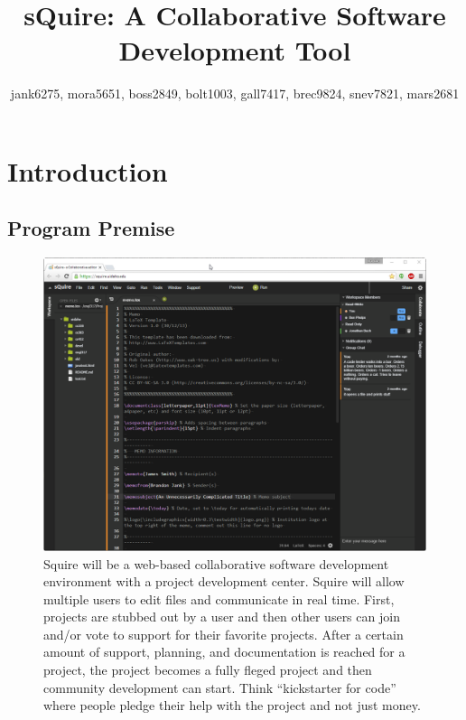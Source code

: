 \documentclass[11pt]{report}
\title{sQuire: A Collaborative Software Development Tool}
\author{jank6275, mora5651, boss2849, bolt1003, gall7417, brec9824, snev7821, mars2681}
\begin{document}
\maketitle

\tableofcontents

\chapter{Introduction}

\section{Program Premise}
    \begin{figure}[h!]
        \caption{Squire will be a web-based collaborative software development environment with a project development center. Squire will allow multiple users to edit files and communicate in real time. First, projects are stubbed out by a user and then other users can join and/or vote to support for their favorite projects. After a certain amount of support, planning, and documentation is reached for a project, the project becomes a fully fleged project and then community development can start. Think ``kickstarter for code'' where people pledge their help with the project and not just money.}
        \includegraphics[width=\textwidth]{squire}
    \end{figure}
\end{document}
